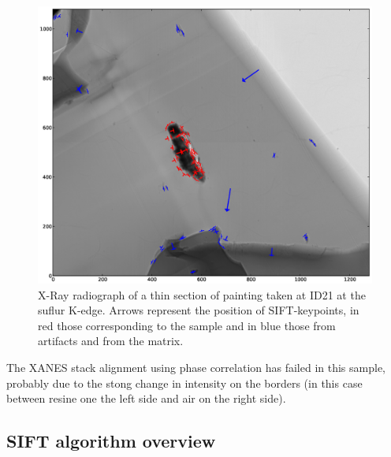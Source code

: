 \documentclass[preprint]{iucr}
\begin{document}
\begin{figure}
\begin{center}
\includegraphics[width=15cm]{features.eps}
\caption{\label{sample} X-Ray radiograph of a thin section of painting
taken at ID21 at the suflur K-edge. Arrows represent the position of
SIFT-keypoints, in red those corresponding to the sample and in blue those from artifacts and from
the matrix.}
\end{center}
\end{figure}

The XANES stack alignment using phase correlation has failed in this sample,
probably due to the stong change in intensity on the borders (in this case 
between resine one the left side and air on the right side).

\subsection{SIFT algorithm overview}

\end{document}
